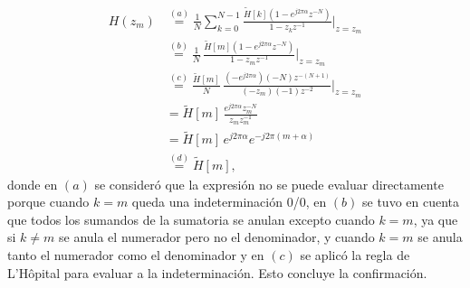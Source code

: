 \documentclass[a4paper]{report}
\begin{document}
\begin{align*}
 H(z_m)&\overset{(a)}{=}\frac{1}{N}\sum_{k=0}^{N-1}\frac{\tilde{H}[k](1-e^{j2\pi\alpha}z^{-N})}{1-z_kz^{-1}}\Bigg|_{z=z_m}\\
  &\overset{(b)}{=}\frac{1}{N}\,\frac{\tilde{H}[m](1-e^{j2\pi\alpha}z^{-N})}{1-z_mz^{-1}}\Bigg|_{z=z_m}\\
  &\overset{(c)}{=}\frac{\tilde{H}[m]}{N}\,\frac{(-e^{j2\pi\alpha})(-N)z^{-(N+1)}}{(-z_m)(-1)z^{-2}}\Bigg|_{z=z_m}\\
  &=\tilde{H}[m]\,\frac{e^{j2\pi\alpha}z_m^{-N}}{z_mz_m^{-1}}\\
  &=\tilde{H}[m]\,e^{j2\pi\alpha}e^{-j2\pi(m+\alpha)}\\
  &\overset{(d)}{=}\tilde{H}[m],
\end{align*}
donde en \((a)\) se consideró que la expresión no se puede evaluar directamente porque cuando \(k=m\) queda una indeterminación 0/0, en \((b)\) se tuvo en cuenta que todos los sumandos de la sumatoria se anulan excepto cuando \(k=m\), ya que si \(k\neq m\) se anula el numerador pero no el denominador, y cuando \(k=m\) se anula tanto el numerador como el denominador y en \((c)\) se aplicó la regla de L'Hôpital para evaluar a la indeterminación. Esto concluye la confirmación.
\end{document}
